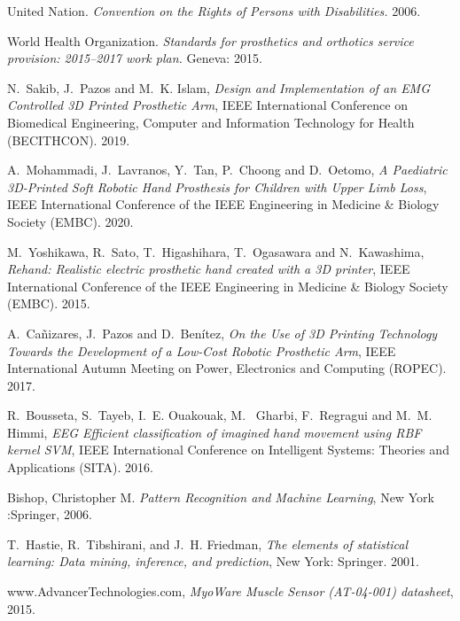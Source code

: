 \documentclass[conference]{IEEEtran}
\begin{document}
\begin{thebibliography}{1}


United Nation. \emph{Convention on the Rights of Persons with Disabilities.} 2006.

World Health Organization. \emph{Standards for prosthetics and orthotics service provision: 2015–2017 work plan.} Geneva: 2015.

N.~Sakib, J.~Pazos and M.~K. Islam, \emph{Design and Implementation of an EMG Controlled 3D Printed Prosthetic Arm}, IEEE International Conference on Biomedical Engineering, Computer and Information Technology for Health (BECITHCON). 2019.

A.~Mohammadi, J.~Lavranos, Y.~Tan, P.~Choong and D.~Oetomo, \emph{A Paediatric 3D-Printed Soft Robotic Hand Prosthesis for Children with Upper Limb Loss}, IEEE International Conference of the IEEE Engineering in Medicine & Biology Society (EMBC). 2020.

M.~Yoshikawa, R.~Sato, T.~Higashihara, T.~Ogasawara and N.~Kawashima, \emph{Rehand: Realistic electric prosthetic hand created with a 3D printer}, IEEE International Conference of the IEEE Engineering in Medicine & Biology Society (EMBC). 2015.

A.~Cañizares, J.~Pazos and D.~Benítez, \emph{On the Use of 3D Printing Technology Towards the
Development of a Low-Cost Robotic Prosthetic Arm}, IEEE International Autumn Meeting on Power, Electronics and Computing (ROPEC). 2017.

R.~Bousseta, S.~Tayeb, I.~E. Ouakouak, M.~ Gharbi, F.~Regragui and M.~M. Himmi, \emph{EEG Efficient classification of imagined hand
movement using RBF kernel SVM}, IEEE International Conference on Intelligent Systems: Theories and Applications (SITA). 2016.

Bishop, Christopher M. \emph{Pattern Recognition and Machine Learning}, New York :Springer, 2006.

T.~Hastie, R.~Tibshirani, and J.~H. Friedman, \emph{The elements of statistical learning: Data mining, inference, and prediction}, New York: Springer. 2001.

www.AdvancerTechnologies.com, \emph{MyoWare Muscle Sensor (AT-04-001) datasheet}, 2015.

\end{thebibliography}
\end{document}

